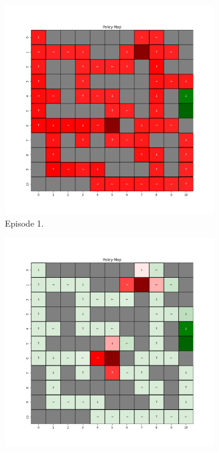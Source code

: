 \documentclass{assignment}
\begin{document}
\begin{figure}[H]
    \begin{subfigure}{0.3\textwidth}
        \includegraphics[width=\textwidth]{figures/policy_td/gamma_sweep/policy_alpha_0.1_gamma_0.25_epsilon_0.2_iteration_1.png}
    \caption{Episode 1.}
    \end{subfigure}\hfill
    \begin{subfigure}{0.3\textwidth}
        \includegraphics[width=\textwidth]{figures/policy_td/gamma_sweep/policy_alpha_0.1_gamma_0.25_epsilon_0.2_iteration_50.png}

\end{subfigure}
\end{figure}
\end{document}
